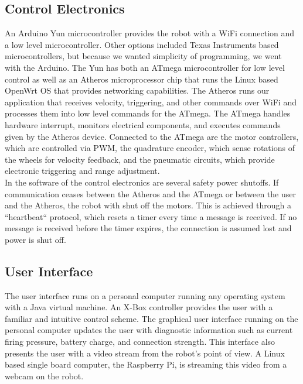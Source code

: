 \documentclass[letterpaper,12pt]{article}
\begin{document}
\subsection{Control Electronics}
An Arduino Yun microcontroller provides the robot with a WiFi connection and a low level microcontroller. Other options included Texas Instruments based microcontrollers, but because we wanted simplicity of programming, we went with the Arduino. The Yun has both an ATmega microcontroller for low level control as well as an Atheros microprocessor chip that runs the Linux based OpenWrt OS that provides networking capabilities. The Atheros runs our application that receives velocity, triggering, and other commands over WiFi and processes them into low level commands for the ATmega. The ATmega handles hardware interrupt, monitors electrical components, and executes commands given by the Atheros device. Connected to the ATmega are the motor controllers, which are controlled via PWM, the quadrature encoder, which sense rotations of the wheels for velocity feedback, and the pneumatic circuits, which provide electronic triggering and range adjustment. \\
In the software of the control electronics are several safety power shutoffs. If communication ceases between the Atheros and the ATmega or between the user and the Atheros, the robot with shut off the motors. This is achieved through a “heartbeat“ protocol, which resets a timer every time a message is received. If no message is received before the timer expires, the connection is assumed lost and power is shut off.\\
\subsection{User Interface}
The user interface runs on a personal computer running any operating system with a Java virtual machine. An X-Box controller provides the user with a familiar and intuitive control scheme. The graphical user interface running on the personal computer updates the user with diagnostic information such as current firing pressure, battery charge, and connection strength. This interface also presents the user with a video stream from the robot’s point of view. A Linux based single board computer, the Raspberry Pi, is streaming this video from a webcam on the robot.\\
\end{document}
